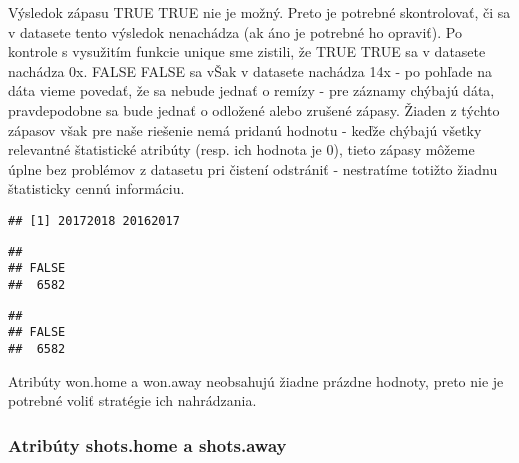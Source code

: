 \documentclass[
]{article}
\newenvironment{Shaded}{\begin{snugshade}}{\end{snugshade}}
\newcommand{\FunctionTok}[1]{\textcolor[rgb]{0.00,0.00,0.00}{#1}}
\newcommand{\NormalTok}[1]{#1}
\newcommand{\SpecialCharTok}[1]{\textcolor[rgb]{0.00,0.00,0.00}{#1}}
\begin{document}
Výsledok zápasu TRUE TRUE nie je možný. Preto je potrebné skontrolovať,
či sa v datasete tento výsledok nenachádza (ak áno je potrebné ho
opraviť). Po kontrole s vysužitím funkcie unique sme zistili, že TRUE
TRUE sa v datasete nachádza 0x. FALSE FALSE sa vŠak v datasete nachádza
14x - po pohľade na dáta vieme povedať, že sa nebude jednať o remízy -
pre záznamy chýbajú dáta, pravdepodobne sa bude jednať o odložené alebo
zrušené zápasy. Žiaden z týchto zápasov však pre naše riešenie nemá
pridanú hodnotu - keďže chýbajú všetky relevantné štatistické atribúty
(resp. ich hodnota je 0), tieto zápasy môžeme úplne bez problémov z
datasetu pri čistení odstrániť - nestratíme totižto žiadnu štatisticky
cennú informáciu.

\begin{Shaded}
\end{Shaded}

\begin{verbatim}
## [1] 20172018 20162017
\end{verbatim}

\begin{Shaded}
\end{Shaded}

\begin{verbatim}
## 
## FALSE 
##  6582
\end{verbatim}

\begin{Shaded}
\end{Shaded}

\begin{verbatim}
## 
## FALSE 
##  6582
\end{verbatim}

Atribúty won.home a won.away neobsahujú žiadne prázdne hodnoty, preto
nie je potrebné voliť stratégie ich nahrádzania.

\hypertarget{atribuxfaty-shots.home-a-shots.away}{%
\subsubsection{Atribúty shots.home a
shots.away}\label{atribuxfaty-shots.home-a-shots.away}}
\end{document}
